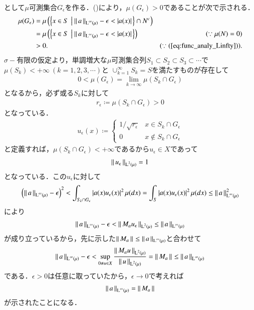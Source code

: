 \begin{prf}
\begin{description}
\begin{align}
		\end{align}
		として$\mu$可測集合$G_\epsilon$を作る．()により，$\mu(G_\epsilon) > 0$であることが次で示される．
		\begin{align}
			\mu(G_\epsilon) &= \mu\left(\left\{x \in S\ \left|\ \Norm{a}{\Lp{\infty}{\mu}}-\epsilon < |a(x)|\right.\right\} \cap N^c\right) \\
			&= \mu\left(\left\{x \in S\ \left|\ \Norm{a}{\Lp{\infty}{\mu}}-\epsilon < |a(x)|\right.\right\}\right) & (\because \mu(N)=0) \\
			&> 0. & (\because (\refeq{eq:func_analy_Linfty})).
 		\end{align}
		$\sigma-$有限の仮定より，単調増大な$\mu$可測集合列$S_1 \subset S_2 \subset S_3 \subset \cdots$で$\mu(S_k) < +\infty\ (k=1,2,3,\cdots)$と
		$\cup_{k=1}^{\infty}S_k = S$を満たすものが存在して
		\begin{align}
			0 < \mu(G_\epsilon) = \lim_{k \to \infty} \mu(S_k \cap G_\epsilon)
		\end{align}
		となるから，必ず或る$S_{k}$に対して
		\begin{align}
			r_\epsilon \coloneqq \mu(S_{k} \cap G_\epsilon) > 0
		\end{align}
		となっている．
		\begin{align}
			u_\epsilon(x) \coloneqq 
			\begin{cases}
				1/\sqrt{r_\epsilon} & x \in S_{k} \cap G_\epsilon \\
				0 & x \notin S_{k} \cap G_\epsilon
			\end{cases}
		\end{align}
		と定義すれば，$\mu(S_{k} \cap G_\epsilon) < +\infty$であるから$u_\epsilon \in X$であって
		\begin{align}
			\left\|\, u_\epsilon\, \right\|_{\operatorname{L}^{2} \left(\mu\right)} = 1
		\end{align}
		となっている．この$u_\epsilon$に対して
		\begin{align}
			\left(\left\|\, a\, \right\|_{\operatorname{L}^{\infty} \left(\mu\right)} - \epsilon\right)^2 
			< \int_{S_k \cap G_\epsilon} |a(x)u_\epsilon(x)|^2\, \mu(dx) 
			= \int_{S} |a(x)u_\epsilon(x)|^2\, \mu(dx)
			\leq \left\|\, a\, \right\|_{\operatorname{L}^{\infty} \left(\mu\right)}^2
		\end{align}
		により
		\begin{align}
			\left\|\, a\, \right\|_{\operatorname{L}^{\infty} \left(\mu\right)} - \epsilon < \left\|\, M_a u_\epsilon\, \right\|_{\operatorname{L}^{2} \left(\mu\right)} \leq \left\|\, a\, \right\|_{\operatorname{L}^{\infty} \left(\mu\right)}
		\end{align}
		が成り立っているから，先に示した$\left\|\, M_a\, \right\|_{} \leq \left\|\, a\, \right\|_{\operatorname{L}^{\infty} \left(\mu\right)}$と合わせて
		\begin{align}
			\left\|\, a\, \right\|_{\operatorname{L}^{\infty} \left(\mu\right)} - \epsilon 
			< \operatorname*{sup}_{0 \neq u \in X} \frac{\left\|\, M_a u\, \right\|_{\operatorname{L}^{2} \left(\mu\right)}}{\left\|\, u\, \right\|_{\operatorname{L}^{2} \left(\mu\right)}} = \left\|\, M_a\, \right\|_{} 
			\leq \left\|\, a\, \right\|_{\operatorname{L}^{\infty} \left(\mu\right)}
		\end{align}
		である．$\epsilon > 0$は任意に取っていたから，$\epsilon \rightarrow 0$で考えれば
		\begin{align}
			\left\|\, a\, \right\|_{\operatorname{L}^{\infty} \left(\mu\right)} = \left\|\, M_a\, \right\|_{}
		\end{align}
		が示されたことになる．
		

\end{description}
\end{prf}
